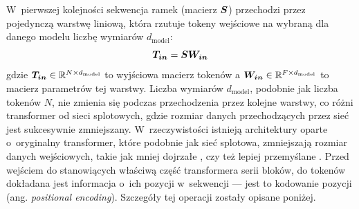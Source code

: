 W~pierwszej kolejności sekwencja ramek (macierz $\boldsymbol{S}$) przechodzi przez pojedynczą warstwę liniową, która rzutuje tokeny wejściowe na wybraną dla danego modelu liczbę wymiarów $d_{\mathrm{model}}$:
\begin{equation}
    \boldsymbol{T_{in}} = \boldsymbol{S} \boldsymbol{W_{in}}
\end{equation}
gdzie $\boldsymbol{T_{in}} \in \mathbb{R}^{N \times d_{\mathrm{model}}}$ to wyjściowa macierz tokenów a $\boldsymbol{W_{in}} \in \mathbb{R}^{F \times d_{\mathrm{model}}}$ to macierz parametrów tej warstwy. Liczba wymiarów $d_{\mathrm{model}}$, podobnie jak liczba tokenów $N$, nie zmienia się podczas przechodzenia przez kolejne warstwy, co różni transformer od sieci splotowych, gdzie rozmiar danych przechodzących przez sieć jest sukcesywnie zmniejszany. W~rzeczywistości istnieją architektury oparte o~oryginalny transformer, które podobnie jak sieć splotowa, zmniejszają rozmiar danych wejściowych, takie jak mniej dojrzałe \cite{liu_swin_2021}, czy też lepiej przemyślane \cite{dai_coatnet_2021}. Przed wejściem do stanowiących właściwą część transformera serii bloków, do tokenów dokładana jest informacja o~ich pozycji w~sekwencji --- jest to kodowanie pozycji (ang. \emph{positional encoding}). Szczegóły tej operacji zostały opisane poniżej.

